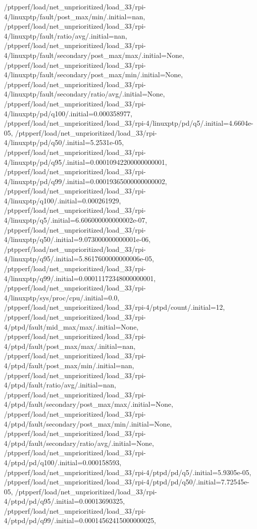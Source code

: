 {    /ptpperf/load/net_unprioritized/load_33/rpi-4/linuxptp/fault/post_max/min/.initial=nan,
    /ptpperf/load/net_unprioritized/load_33/rpi-4/linuxptp/fault/ratio/avg/.initial=nan,
    /ptpperf/load/net_unprioritized/load_33/rpi-4/linuxptp/fault/secondary/post_max/max/.initial=None,
    /ptpperf/load/net_unprioritized/load_33/rpi-4/linuxptp/fault/secondary/post_max/min/.initial=None,
    /ptpperf/load/net_unprioritized/load_33/rpi-4/linuxptp/fault/secondary/ratio/avg/.initial=None,
    /ptpperf/load/net_unprioritized/load_33/rpi-4/linuxptp/pd/q100/.initial=0.000358977,
    /ptpperf/load/net_unprioritized/load_33/rpi-4/linuxptp/pd/q5/.initial=4.6604e-05,
    /ptpperf/load/net_unprioritized/load_33/rpi-4/linuxptp/pd/q50/.initial=5.2531e-05,
    /ptpperf/load/net_unprioritized/load_33/rpi-4/linuxptp/pd/q95/.initial=0.00010942200000000001,
    /ptpperf/load/net_unprioritized/load_33/rpi-4/linuxptp/pd/q99/.initial=0.00019365000000000002,
    /ptpperf/load/net_unprioritized/load_33/rpi-4/linuxptp/q100/.initial=0.000261929,
    /ptpperf/load/net_unprioritized/load_33/rpi-4/linuxptp/q5/.initial=6.606000000000002e-07,
    /ptpperf/load/net_unprioritized/load_33/rpi-4/linuxptp/q50/.initial=9.073000000000001e-06,
    /ptpperf/load/net_unprioritized/load_33/rpi-4/linuxptp/q95/.initial=5.8617600000000006e-05,
    /ptpperf/load/net_unprioritized/load_33/rpi-4/linuxptp/q99/.initial=0.00011172348000000001,
    /ptpperf/load/net_unprioritized/load_33/rpi-4/linuxptp/sys/proc/cpu/.initial=0.0,
    /ptpperf/load/net_unprioritized/load_33/rpi-4/ptpd/count/.initial=12,
    /ptpperf/load/net_unprioritized/load_33/rpi-4/ptpd/fault/mid_max/max/.initial=None,
    /ptpperf/load/net_unprioritized/load_33/rpi-4/ptpd/fault/post_max/max/.initial=nan,
    /ptpperf/load/net_unprioritized/load_33/rpi-4/ptpd/fault/post_max/min/.initial=nan,
    /ptpperf/load/net_unprioritized/load_33/rpi-4/ptpd/fault/ratio/avg/.initial=nan,
    /ptpperf/load/net_unprioritized/load_33/rpi-4/ptpd/fault/secondary/post_max/max/.initial=None,
    /ptpperf/load/net_unprioritized/load_33/rpi-4/ptpd/fault/secondary/post_max/min/.initial=None,
    /ptpperf/load/net_unprioritized/load_33/rpi-4/ptpd/fault/secondary/ratio/avg/.initial=None,
    /ptpperf/load/net_unprioritized/load_33/rpi-4/ptpd/pd/q100/.initial=0.000158593,
    /ptpperf/load/net_unprioritized/load_33/rpi-4/ptpd/pd/q5/.initial=5.9305e-05,
    /ptpperf/load/net_unprioritized/load_33/rpi-4/ptpd/pd/q50/.initial=7.72545e-05,
    /ptpperf/load/net_unprioritized/load_33/rpi-4/ptpd/pd/q95/.initial=0.00013690325,
    /ptpperf/load/net_unprioritized/load_33/rpi-4/ptpd/pd/q99/.initial=0.00014562415000000025,
}

